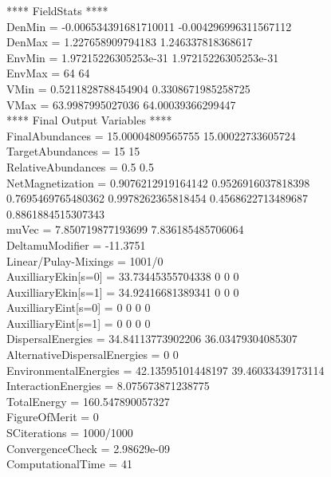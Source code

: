 \documentclass[a4paper,10pt]{article}
\begin{document}
**** FieldStats ****\\DenMin = -0.006534391681710011 -0.004296996311567112 \\DenMax = 1.227658909794183 1.246337818368617 \\EnvMin = 1.97215226305253e-31 1.97215226305253e-31 \\EnvMax = 64 64 \\VMin = 0.5211828788454904 0.3308671985258725 \\VMax = 63.9987995027036 64.00039366299447 \\**** Final Output Variables ****\\FinalAbundances              = 15.00004809565755 15.00022733605724 \\TargetAbundances             = 15 15 \\RelativeAbundances           = 0.5 0.5 \\NetMagnetization             = 0.9076212919164142 0.9526916037818398 0.7695469765480362 0.9978262365818454 0.4568622713489687 0.8861884515307343 \\muVec                        = 7.850719877193699 7.836185485706064 \\DeltamuModifier              = -11.3751\\Linear/Pulay-Mixings         = 1001/0\\AuxilliaryEkin[s=0]          = 33.73445355704338 0 0 0 \\AuxilliaryEkin[s=1]          = 34.92416681389341 0 0 0 \\AuxilliaryEint[s=0]          = 0 0 0 0 \\AuxilliaryEint[s=1]          = 0 0 0 0 \\DispersalEnergies            = 34.84113773902206 36.03479304085307 \\AlternativeDispersalEnergies = 0 0 \\EnvironmentalEnergies        = 42.13595101448197 39.46033439173114 \\InteractionEnergies          = 8.075673871238775 \\TotalEnergy                  = 160.547890057327\\FigureOfMerit                = 0\\SCiterations                 = 1000/1000\\ConvergenceCheck             = 2.98629e-09\\ComputationalTime            = 41\\\newpage 
\end{document}
